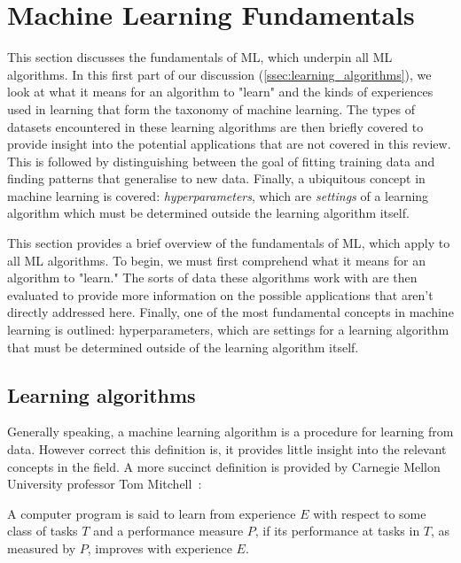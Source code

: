 \section{Machine Learning Fundamentals}
This section discusses the fundamentals of \gls{ML}, which underpin all \gls{ML} algorithms. In this first part of our discussion (\autoref{ssec:learning_algorithms}), we look at what it means for an algorithm to "learn" and the kinds of experiences used in learning that form the taxonomy of machine learning. The types of datasets encountered in these learning algorithms are then briefly covered to provide insight into the potential applications that are not covered in this review. This is followed by distinguishing between the goal of fitting training data and finding patterns that generalise to new data. Finally, a ubiquitous concept in machine learning is covered: \textit{hyperparameters}, which are \textit{settings} of a learning algorithm which must be determined outside the learning algorithm itself.

This section provides a brief overview of the fundamentals of \gls{ML}, which apply to all \gls{ML} algorithms. To begin, we must first comprehend what it means for an algorithm to "learn." The sorts of data these algorithms work with are then evaluated to provide more information on the possible applications that aren't directly addressed here. Finally, one of the most fundamental concepts in machine learning is outlined: hyperparameters, which are settings for a learning algorithm that must be determined outside of the learning algorithm itself.

\subsection{Learning algorithms\label{ssec:learning_algorithms}}
Generally speaking, a machine learning algorithm is a procedure for learning from data. However correct this definition is, it provides little insight into the relevant concepts in the field. A more succinct definition is provided by Carnegie Mellon University professor Tom Mitchell~\cite{Mitchell97LearningAlgorithm}:

\begin{fancyquotes}
    A computer program is said to learn from experience $E$ with respect
    to some class of tasks $T$ and a performance measure $P$, if its performance
    at tasks in $T$, as measured by $P$, improves with experience $E$.
\end{fancyquotes}

